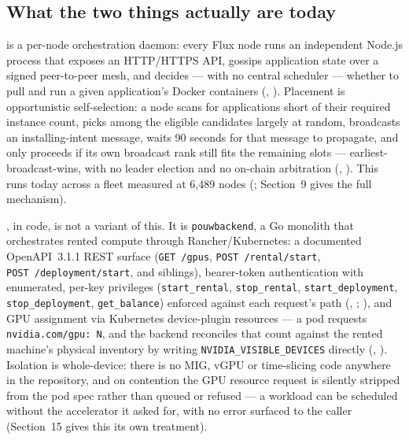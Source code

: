 \subsection{What the two things actually are today}

\FluxOS is a per-node orchestration daemon: every Flux node runs an independent Node.js process that
exposes an HTTP/HTTPS API, gossips application state over a signed peer-to-peer mesh, and decides —
with no central scheduler — whether to pull and run a given application's Docker containers
(\shipped, ). Placement is
opportunistic self-selection: a node scans for applications short of their required instance count,
picks among the eligible candidates largely at random, broadcasts an installing-intent message, waits
90 seconds for that message to propagate, and only proceeds if its own broadcast rank still fits the
remaining slots — earliest-broadcast-wins, with no leader election and no on-chain arbitration
(\shipped, ). This
runs today across a fleet measured at 6,489 nodes
(; Section~9 gives the full mechanism).

\FluxEdge, in code, is not a variant of this. It is \texttt{pouwbackend}, a Go monolith that
orchestrates rented compute through Rancher/Kubernetes: a documented OpenAPI~3.1.1 REST surface
(\texttt{GET~/gpus}, \texttt{POST~/\allowbreak{}rental/\allowbreak{}start}, \texttt{POST~/\allowbreak{}deployment/\allowbreak{}start}, and siblings),
bearer-token authentication with enumerated, per-key privileges (\texttt{start\_rental},
\texttt{stop\_rental}, \texttt{start\_deployment}, \texttt{stop\_deployment}, \texttt{get\_balance})
enforced against each request's path (\shipped,
;
), and GPU assignment via Kubernetes
device-plugin resources — a pod requests \texttt{nvidia.\allowbreak{}com/\allowbreak{}gpu:\allowbreak{}~N}, and the backend reconciles that
count against the rented machine's physical inventory by writing
\texttt{NVIDIA\_VISIBLE\_DEVICES} directly (\shipped,
). Isolation is whole-device: there is no MIG,
vGPU or time-slicing code anywhere in the repository, and on contention the GPU resource request is
silently stripped from the pod spec rather than queued or refused — a workload can be scheduled
without the accelerator it asked for, with no error surfaced to the caller (Section~15 gives this its
own treatment).

